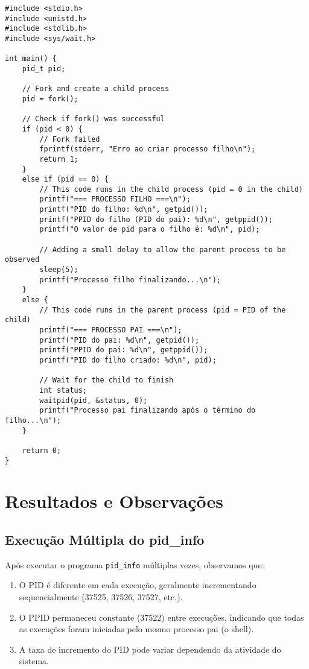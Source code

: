 \documentclass[a4paper,11pt]{article}
\begin{document}
\begin{verbatim}
#include <stdio.h>
#include <unistd.h>
#include <stdlib.h>
#include <sys/wait.h>

int main() {
    pid_t pid;
    
    // Fork and create a child process
    pid = fork();
    
    // Check if fork() was successful
    if (pid < 0) {
        // Fork failed
        fprintf(stderr, "Erro ao criar processo filho\n");
        return 1;
    } 
    else if (pid == 0) {
        // This code runs in the child process (pid = 0 in the child)
        printf("=== PROCESSO FILHO ===\n");
        printf("PID do filho: %d\n", getpid());
        printf("PPID do filho (PID do pai): %d\n", getppid());
        printf("O valor de pid para o filho é: %d\n", pid);
        
        // Adding a small delay to allow the parent process to be observed
        sleep(5);
        printf("Processo filho finalizando...\n");
    } 
    else {
        // This code runs in the parent process (pid = PID of the child)
        printf("=== PROCESSO PAI ===\n");
        printf("PID do pai: %d\n", getpid());
        printf("PPID do pai: %d\n", getppid());
        printf("PID do filho criado: %d\n", pid);
        
        // Wait for the child to finish
        int status;
        waitpid(pid, &status, 0);
        printf("Processo pai finalizando após o término do filho...\n");
    }
    
    return 0;
}
\end{verbatim}

\section{Resultados e Observações}

\subsection{Execução Múltipla do pid\_info}

Após executar o programa \texttt{pid\_info} múltiplas vezes, observamos que:

\begin{enumerate}
    \item O PID é diferente em cada execução, geralmente incrementando sequencialmente (37525, 37526, 37527, etc.).
    \item O PPID permaneceu constante (37522) entre execuções, indicando que todas as execuções foram iniciadas pelo mesmo processo pai (o shell).
    \item A taxa de incremento do PID pode variar dependendo da atividade do sistema.
\end{enumerate}
\end{document}
